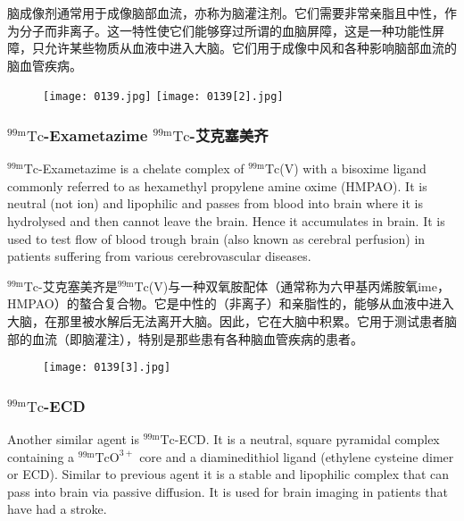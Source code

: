 \documentclass[dvipsnames, svgnames,a4paper,11pt]{article}
\begin{document}
脑成像剂通常用于成像脑部血流，亦称为脑灌注剂。它们需要非常亲脂且中性，作为分子而非离子。这一特性使它们能够穿过所谓的血脑屏障，这是一种功能性屏障，只允许某些物质从血液中进入大脑。它们用于成像中风和各种影响脑部血流的脑血管疾病。

\begin{figure}[h]
	\centering
    \texttt{[image: 0139.jpg]}    
    \hspace{0.1in}
    \texttt{[image: 0139[2].jpg]} 
     \label{fig145}
\end{figure}


\subsubsection{${}^\mathrm{99m}\mathrm{Tc}$-Exametazime ${}^\mathrm{99m}\mathrm{Tc}$-艾克塞美齐}

${}^\mathrm{99m}\mathrm{Tc}$-Exametazime is a chelate complex of ${}^\mathrm{99m}\mathrm{Tc}$(V) with a bisoxime ligand
commonly referred to as hexamethyl propylene amine oxime (HMPAO). It is neutral
(not ion) and lipophilic and passes from blood into brain where it is hydrolysed and
then cannot leave the brain. Hence it accumulates in brain. It is used to test flow of
blood trough brain (also known as cerebral perfusion) in patients suffering from
various cerebrovascular diseases.

${}^\mathrm{99m}\mathrm{Tc}$-艾克塞美齐是${}^\mathrm{99m}\mathrm{Tc}$(V)与一种双氧胺配体（通常称为六甲基丙烯胺氧ime，HMPAO）的螯合复合物。它是中性的（非离子）和亲脂性的，能够从血液中进入大脑，在那里被水解后无法离开大脑。因此，它在大脑中积累。它用于测试患者脑部的血流（即脑灌注），特别是那些患有各种脑血管疾病的患者。

\begin{figure}[h]
	\centering
    \texttt{[image: 0139[3].jpg]}    
     \label{fig146}
\end{figure}

\subsubsection{${}^\mathrm{99m}\mathrm{Tc}$-ECD}

Another similar agent is ${}^\mathrm{99m}\mathrm{Tc}$-ECD. It is a neutral, square pyramidal complex
containing a ${}^\mathrm{99m}\mathrm{TcO^{3+}}$ core and a diaminedithiol ligand (ethylene cysteine dimer or
ECD). Similar to previous agent it is a stable and lipophilic complex that can pass
into brain via passive diffusion. It is used for brain imaging in patients that have had
a stroke.
\end{document}
